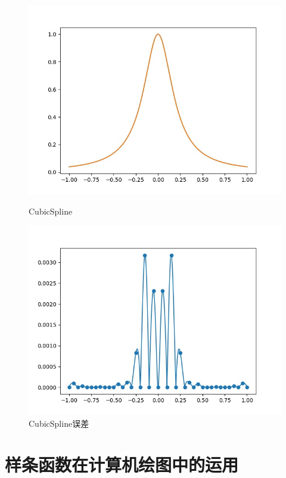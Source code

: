 \documentclass{article}
\numberwithin{equation}{section}
\numberwithin{table}{section}
\begin{document}
\begin{figure}[H]
    \begin{minipage}[t]{0.48\linewidth}
        \centering
        \includegraphics[scale=0.5]{fCubicSpline.jpg}
        \caption{CubicSpline}
    \end{minipage}
    \begin{minipage}[t]{0.48\linewidth}
        \centering
        \includegraphics[scale=0.5]{fCubicSpline.sub.jpg}
        \caption{CubicSpline误差}
    \end{minipage}
\end{figure}
\section{样条函数在计算机绘图中的运用}
\end{document}

